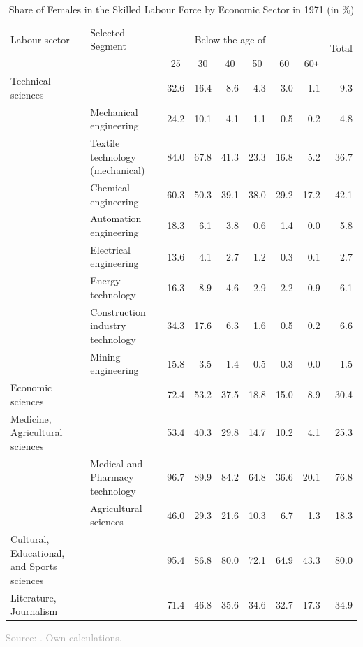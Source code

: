 \documentclass[11pt, aspectratio=1610, xcolor={dvipsnames}]{beamer}
\newcommand*{\myalign}[2]{\multicolumn{1}{#1}{#2}}
\begin{document}
	\begin{frame}
		\frametitle{}
		
		{\linespread{1}\tiny
			\begin{table}[h]
				\centering
				\caption{Share of Females in the Skilled Labour Force by Economic Sector in 1971 (in \%)}
				\label{tab:gdr_yearbook}
				
				\begin{tabular}{llrrrrrrr}
					\toprule
					Labour sector & Selected Segment & \multicolumn{5}{c}{Below the age of} & & \multirow[c]{2}{*}{Total} \\
					& & \myalign{c}{25} & \myalign{c}{30} & \myalign{c}{40} & \myalign{c}{50} & \myalign{c}{60} & \myalign{c}{60\texttt{+}} & \\
					\midrule
					Technical sciences & & 32.6 & 16.4 & 8.6 & 4.3 & 3.0 & 1.1 & 9.3 \\
					& Mechanical engineering & 24.2 & 10.1 & 4.1 & 1.1 & 0.5 & 0.2 & 4.8 \\
					& Textile technology (mechanical) & 84.0 & 67.8 & 41.3 & 23.3 & 16.8 & 5.2 & 36.7 \\
					& Chemical engineering & 60.3 & 50.3 & 39.1 & 38.0 & 29.2 & 17.2 & 42.1 \\
					& Automation engineering & 18.3 & 6.1 & 3.8 & 0.6 & 1.4 & 0.0 & 5.8 \\
					& Electrical engineering & 13.6 & 4.1 & 2.7 & 1.2 & 0.3 & 0.1 & 2.7 \\
					& Energy technology & 16.3 & 8.9 & 4.6 & 2.9 & 2.2 & 0.9 & 6.1 \\
					& Construction industry technology & 34.3 & 17.6 & 6.3 & 1.6 & 0.5 & 0.2 & 6.6 \\
					& Mining engineering &  15.8 & 3.5 & 1.4 & 0.5 & 0.3 & 0.0 & 1.5 \\
					Economic sciences & & 72.4 & 53.2 & 37.5 & 18.8 & 15.0 & 8.9 & 30.4 \\
					Medicine, Agricultural sciences & & 53.4 & 40.3 & 29.8 & 14.7 & 10.2 & 4.1 & 25.3 \\
					& Medical and Pharmacy technology & 96.7 & 89.9 & 84.2 &  64.8 & 36.6 & 20.1 & 76.8 \\
					& Agricultural sciences & 46.0 & 29.3 & 21.6 & 10.3 & 6.7 & 1.3 & 18.3 \\
					Cultural, Educational, and Sports sciences & & 95.4 & 86.8 & 80.0 & 72.1 & 64.9 & 43.3 & 80.0 \\
					Literature, Journalism & & 71.4 & 46.8 & 35.6 & 34.6 & 32.7 & 17.3 & 34.9 \\
					\bottomrule
				\end{tabular}
			\end{table}
		}
		
		{\scriptsize
			\textcolor{darkgray}{Source: \cite[p. 442]{DDRJahrbuch1973}. Own calculations.}
		}
		
		
	\end{frame}
	
\end{document}
